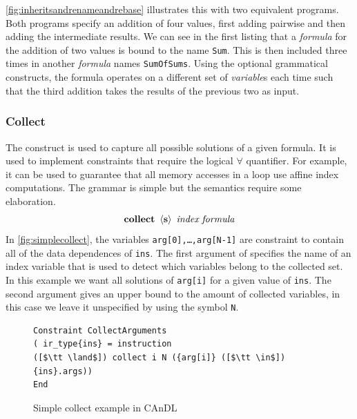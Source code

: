     \autoref{fig:inheritsandrenameandrebase} illustrates this with two
    equivalent programs.
    Both programs specify an addition of four values, first adding pairwise and
    then adding the intermediate results.
    We can see in the first listing that a {\it formula} for the addition of two
    values is bound to the name {\tt Sum}.
    This is then included three times in another {\it formula} names
    {\tt SumOfSums}.
    Using the optional grammatical constructs, the formula operates on a
    different set of {\it variable}s each time such that the third addition
    takes the results of the previous two as input.

\begin{figure}[ht]

\label{fig:inheritsandrenameandrebase}
\end{figure}

\subsubsection{Collect}

    The  construct is used to capture all possible solutions
    of a given formula.
    It is used to implement constraints that require the logical $\forall$
    quantifier.
    For example, it can be used to guarantee that all memory accesses in a loop
    use affine index computations.
    The grammar is simple but the semantics require some elaboration.
    \begin{align*}
        \text{\bf collect}\ \left<\text{\bf s}\right>\ \text{\it index}\ \text{\it formula}
    \end{align*}
    In \autoref{fig:simplecollect}, the variables \texttt{arg[0],\dots,arg[N-1]}
    are constraint to contain all of the data dependences of \texttt{ins}.
    The first argument of  specifies the name of an index
    variable that is used to detect which variables belong to the collected set.
    In this example we want all solutions of \texttt{arg[i]} for a given value
    of \texttt{ins}.
    The second argument gives an upper bound to the amount of collected
    variables, in this case we leave it unspecified by using the symbol
    \texttt{N}.

\begin{figure}[ht]
\begin{lstlisting}[language=CAnDL]
Constraint CollectArguments
( ir_type{ins} = instruction
([$\tt \land$]) collect i N ({arg[i]} ([$\tt \in$]) {ins}.args))
End
\end{lstlisting}
\vspace{-0.3cm}
\caption{Simple collect example in CAnDL}
\label{fig:simplecollect}
\end{figure}

